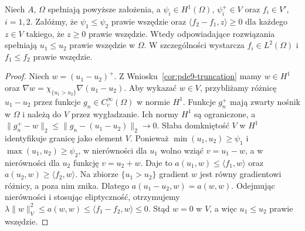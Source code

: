 \begin{twierdzenie}
\label{thm:pde29-order}
Niech $A$, $\Omega$ spełniają powyższe założenia,
a $\psi_i\in H^1(\Omega)$, $\psi_i^+\in V$ oraz
$f_i\in V'$, $i=1,2$. Załóżmy, że
$\psi_1\le\psi_2$ prawie wszędzie oraz
$\langle f_2-f_1,z\rangle\ge0$ dla każdego
$z\in V$ takiego, że $z\ge0$ prawie wszędzie.
Wtedy odpowiadające rozwiązania spełniają $u_1\le u_2$
prawie wszędzie w $\Omega$.
W szczególności wystarcza $f_i\in L^2(\Omega)$
i $f_1\le f_2$ prawie wszędzie.
\end{twierdzenie}
\begin{proof}
Niech $w=(u_1-u_2)^+$.
Z Wniosku~\ref{cor:pde9-truncation} mamy $w\in H^1$
oraz $\nabla w=\chi_{\{u_1>u_2\}}\nabla(u_1-u_2)$.
Aby wykazać $w\in V$, przybliżamy różnicę
$u_1-u_2$ przez funkcje $g_n\in C_c^\infty(\Omega)$
w normie $H^1$. Funkcje $g_n^+$ mają zwarty
nośnik w $\Omega$ i należą do $V$ przez wygładzanie.
Ich normy $H^1$ są ograniczone, a
$\|g_n^+-w\|_2\le\|g_n-(u_1-u_2)\|_2\to0$.
Słaba domkniętość $V$ w $H^1$ identyfikuje
granicę jako element $V$.
Ponieważ
$\min(u_1,u_2)\ge\psi_1$ i
$\max(u_1,u_2)\ge\psi_2$,
w nierówności dla $u_1$ wolno wziąć $v=u_1-w$,
a w nierówności dla $u_2$ funkcję $v=u_2+w$.
Daje to $a(u_1,w)\le\langle f_1,w\rangle$
oraz $a(u_2,w)\ge\langle f_2,w\rangle$.
Na zbiorze $\{u_1>u_2\}$ gradient $w$ jest
równy gradientowi różnicy, a poza nim znika.
Dlatego $a(u_1-u_2,w)=a(w,w)$.
Odejmując nierówności i stosując eliptyczność,
otrzymujemy
$\lambda\|w\|_V^2\le a(w,w)\le
\langle f_1-f_2,w\rangle\le0$.
Stąd $w=0$ w $V$, a więc $u_1\le u_2$ prawie wszędzie.
\end{proof}


